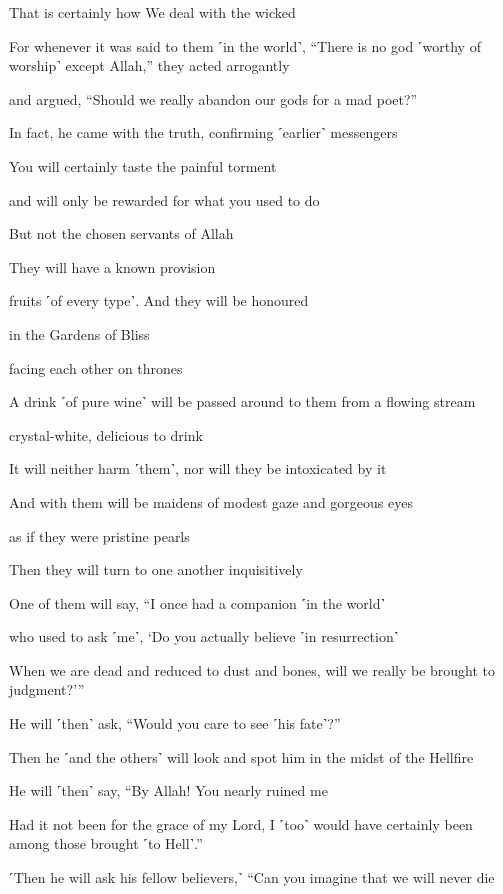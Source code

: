 That is certainly how We deal with the wicked

For whenever it was said to them ˹in the world˺, “There is no god ˹worthy of worship˺ except Allah,” they acted arrogantly

and argued, “Should we really abandon our gods for a mad poet?”

In fact, he came with the truth, confirming ˹earlier˺ messengers

You will certainly taste the painful torment

and will only be rewarded for what you used to do

But not the chosen servants of Allah

They will have a known provision

fruits ˹of every type˺. And they will be honoured

in the Gardens of Bliss

facing each other on thrones

A drink ˹of pure wine˺ will be passed around to them from a flowing stream

crystal-white, delicious to drink

It will neither harm ˹them˺, nor will they be intoxicated by it

And with them will be maidens of modest gaze and gorgeous eyes

as if they were pristine pearls

Then they will turn to one another inquisitively

One of them will say, “I once had a companion ˹in the world˺

who used to ask ˹me˺, ‘Do you actually believe ˹in resurrection˺

When we are dead and reduced to dust and bones, will we really be brought to judgment?’”

He will ˹then˺ ask, “Would you care to see ˹his fate˺?”

Then he ˹and the others˺ will look and spot him in the midst of the Hellfire

He will ˹then˺ say, “By Allah! You nearly ruined me

Had it not been for the grace of my Lord, I ˹too˺ would have certainly been among those brought ˹to Hell˺.”

˹Then he will ask his fellow believers,˺ “Can you imagine that we will never die


